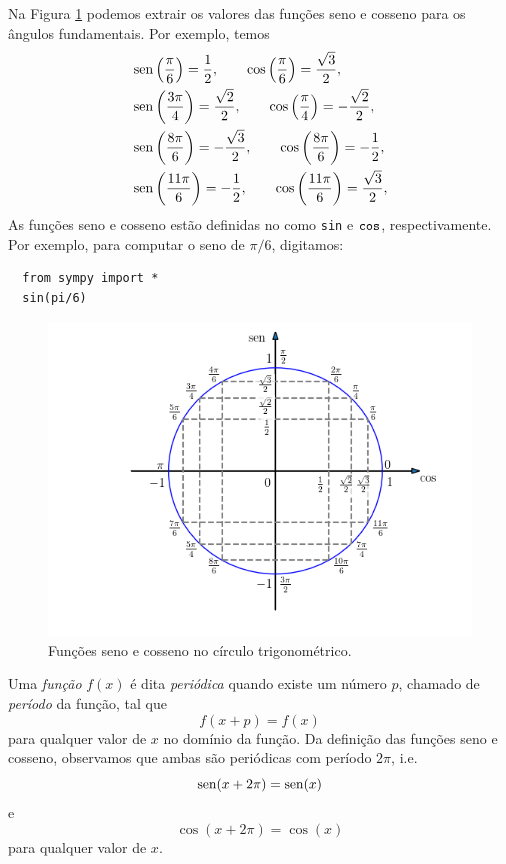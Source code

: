 Na Figura \ref{fig:cos_seno_valores} podemos extrair os valores das funções seno e cosseno para os ângulos fundamentais. Por exemplo, temos
\begin{align}
  &\operatorname{sen}\left(\frac{\pi}{6}\right) = \frac{1}{2},\qquad \cos\left(\frac{\pi}{6}\right) = \frac{\sqrt{3}}{2},\\
  &\operatorname{sen}\left(\frac{3\pi}{4}\right) = \frac{\sqrt{2}}{2},\qquad \cos\left(\frac{\pi}{4}\right) = -\frac{\sqrt{2}}{2},\\
  &\operatorname{sen}\left(\frac{8\pi}{6}\right) = -\frac{\sqrt{3}}{2},\qquad \cos\left(\frac{8\pi}{6}\right) = -\frac{1}{2},\\
  &\operatorname{sen}\left(\frac{11\pi}{6}\right) = -\frac{1}{2},\qquad \cos\left(\frac{11\pi}{6}\right) = \frac{\sqrt{3}}{2},\\
\end{align}
\ifispython
As funções seno e cosseno estão definidas no {\sympy} como \verb+sin+ e $\verb+cos+$, respectivamente. Por exemplo, para computar o seno de $\pi/6$, digitamos:
\begin{lstlisting}
  from sympy import *
  sin(pi/6)
\end{lstlisting}
\fi

\begin{figure}[H]
  \centering
  \includegraphics[width=1\textwidth]{./cap_funcao/dados/fig_cos_seno_valores/fig_cos_seno_valores}
  \caption{Funções seno e cosseno no círculo trigonométrico.}
  \label{fig:cos_seno_valores}
\end{figure}

Uma \emph{função} $f(x)$ é dita \emph{periódica} quando existe um número $p$, chamado de \emph{período} da função, tal que
\begin{equation}
  f(x+p) = f(x)
\end{equation}
para qualquer valor de $x$ no domínio da função. Da definição das funções seno e cosseno, observamos que ambas são periódicas com período $2\pi$, i.e.
\begin{equation}
  \operatorname{sen}(x+2\pi) = \operatorname{sen}(x)
\end{equation}
e
\begin{equation}
   \cos(x+2\pi) = \cos(x)
\end{equation}
para qualquer valor de $x$.

